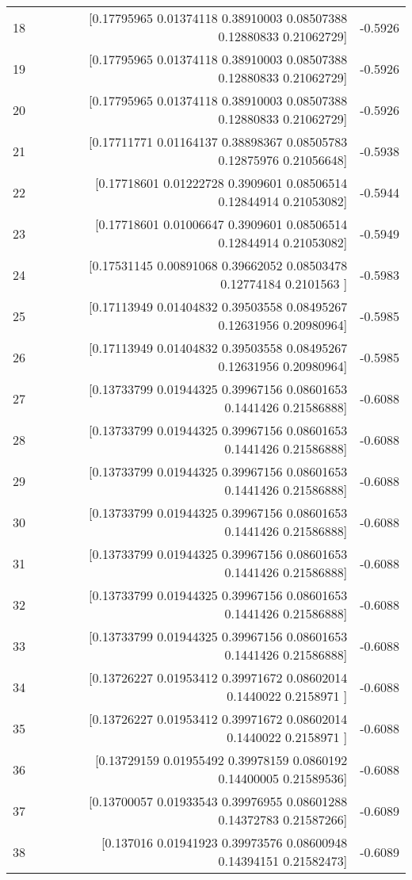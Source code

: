 \begin{longtable}{lrr}
18 & [0.17795965 0.01374118 0.38910003 0.08507388 0.12880833 0.21062729] & -0.5926 \\
19 & [0.17795965 0.01374118 0.38910003 0.08507388 0.12880833 0.21062729] & -0.5926 \\
20 & [0.17795965 0.01374118 0.38910003 0.08507388 0.12880833 0.21062729] & -0.5926 \\
21 & [0.17711771 0.01164137 0.38898367 0.08505783 0.12875976 0.21056648] & -0.5938 \\
22 & [0.17718601 0.01222728 0.3909601  0.08506514 0.12844914 0.21053082] & -0.5944 \\
23 & [0.17718601 0.01006647 0.3909601  0.08506514 0.12844914 0.21053082] & -0.5949 \\
24 & [0.17531145 0.00891068 0.39662052 0.08503478 0.12774184 0.2101563 ] & -0.5983 \\
25 & [0.17113949 0.01404832 0.39503558 0.08495267 0.12631956 0.20980964] & -0.5985 \\
26 & [0.17113949 0.01404832 0.39503558 0.08495267 0.12631956 0.20980964] & -0.5985 \\
27 & [0.13733799 0.01944325 0.39967156 0.08601653 0.1441426  0.21586888] & -0.6088 \\
28 & [0.13733799 0.01944325 0.39967156 0.08601653 0.1441426  0.21586888] & -0.6088 \\
29 & [0.13733799 0.01944325 0.39967156 0.08601653 0.1441426  0.21586888] & -0.6088 \\
30 & [0.13733799 0.01944325 0.39967156 0.08601653 0.1441426  0.21586888] & -0.6088 \\
31 & [0.13733799 0.01944325 0.39967156 0.08601653 0.1441426  0.21586888] & -0.6088 \\
32 & [0.13733799 0.01944325 0.39967156 0.08601653 0.1441426  0.21586888] & -0.6088 \\
33 & [0.13733799 0.01944325 0.39967156 0.08601653 0.1441426  0.21586888] & -0.6088 \\
34 & [0.13726227 0.01953412 0.39971672 0.08602014 0.1440022  0.2158971 ] & -0.6088 \\
35 & [0.13726227 0.01953412 0.39971672 0.08602014 0.1440022  0.2158971 ] & -0.6088 \\
36 & [0.13729159 0.01955492 0.39978159 0.0860192  0.14400005 0.21589536] & -0.6088 \\
37 & [0.13700057 0.01933543 0.39976955 0.08601288 0.14372783 0.21587266] & -0.6089 \\
38 & [0.137016   0.01941923 0.39973576 0.08600948 0.14394151 0.21582473] & -0.6089 \\

\end{longtable}
